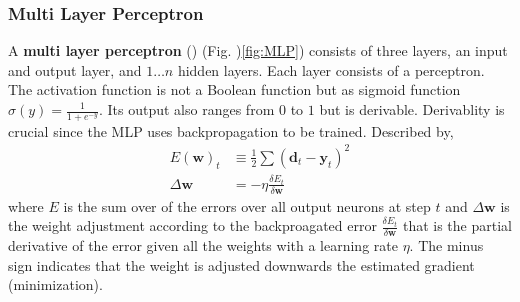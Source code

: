 \subsubsection{Multi Layer Perceptron}
A \textbf{multi layer perceptron} () (Fig. )\ref{fig:MLP}) consists of three layers, an input and output layer, and $1 \dots n$ hidden layers. Each layer consists of a perceptron. The activation function is not a Boolean function but as sigmoid function $\sigma(y) = \frac{1}{1+e^{-y}}$. Its output also ranges from $0$ to $1$ but is derivable. Derivablity is crucial since the MLP uses backpropagation to be trained. Described by,
\begin{align}
  E(\mathbf{w})_t &\equiv \frac{1}{2} \sum (\mathbf{d}_t - \mathbf{y}_t)^2 \\
  \Delta \mathbf{w} &= - \eta \frac{\delta E_t}{\delta \mathbf{w}}
\end{align}
where $E$ is the sum over of the errors over all output neurons at step $t$ and $\Delta \mathbf{w}$ is the weight adjustment according to the backproagated error $\frac{\delta E_t}{\delta \mathbf{w}}$ that is the partial derivative of the error given all the weights with a learning rate $\eta$. The minus sign indicates that the weight is adjusted downwards the estimated gradient (minimization).


